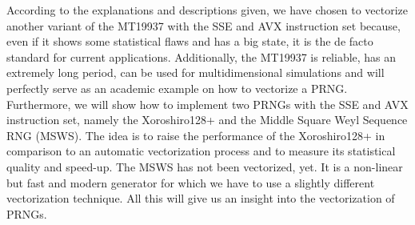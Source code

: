 \documentclass{stdlocal}
\begin{document}
  According to the explanations and descriptions given, we have chosen to vectorize another variant of the MT19937 with the SSE and AVX instruction set because, even if it shows some statistical flaws and has a big state, it is the de facto standard for current applications.
  Additionally, the MT19937 is reliable, has an extremely long period, can be used for multidimensional simulations and will perfectly serve as an academic example on how to vectorize a PRNG.
  Furthermore, we will show how to implement two PRNGs with the SSE and AVX instruction set, namely the Xoroshiro128+ and the Middle Square Weyl Sequence RNG (MSWS).
  The idea is to raise the performance of the Xoroshiro128+ in comparison to an automatic vectorization process and to measure its statistical quality and speed-up.
  The MSWS has not been vectorized, yet.
  It is a non-linear but fast and modern generator for which we have to use a slightly different vectorization technique.
  All this will give us an insight into the vectorization of PRNGs.
\end{document}
